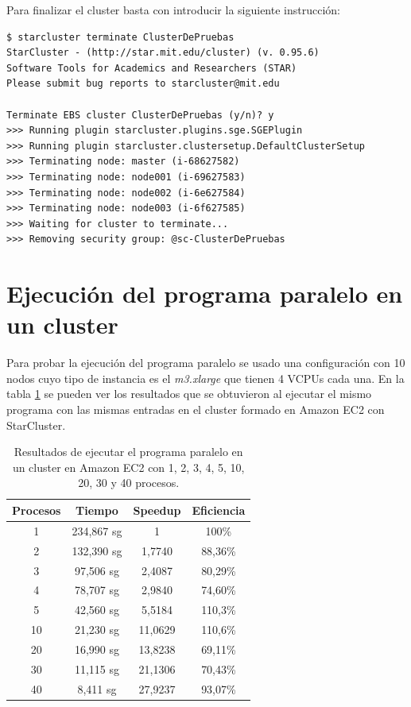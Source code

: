 \documentclass{article}
\begin{document}
	Para finalizar el cluster basta con introducir la siguiente instrucción:
\begin{lstlisting}[style=miniBash]
$ starcluster terminate ClusterDePruebas
StarCluster - (http://star.mit.edu/cluster) (v. 0.95.6)
Software Tools for Academics and Researchers (STAR)
Please submit bug reports to starcluster@mit.edu

Terminate EBS cluster ClusterDePruebas (y/n)? y
>>> Running plugin starcluster.plugins.sge.SGEPlugin
>>> Running plugin starcluster.clustersetup.DefaultClusterSetup
>>> Terminating node: master (i-68627582)
>>> Terminating node: node001 (i-69627583)
>>> Terminating node: node002 (i-6e627584)
>>> Terminating node: node003 (i-6f627585)
>>> Waiting for cluster to terminate... 
>>> Removing security group: @sc-ClusterDePruebas 
\end{lstlisting}

\section{Ejecución del programa paralelo en un cluster}
	Para probar la ejecución del programa paralelo se usado una configuración con 10 nodos cuyo tipo de instancia es el \emph{m3.xlarge} que tienen 4 VCPUs cada una. En la tabla \ref{tab:resultadosCluster} se pueden ver los resultados que se obtuvieron al ejecutar el mismo programa con las mismas entradas en el cluster formado en Amazon EC2 con StarCluster.

\begin{table}[h]
	\begin{center}
		\caption{Resultados de ejecutar el programa paralelo en un cluster en Amazon EC2 con 1, 2, 3, 4, 5, 10, 20, 30 y 40 procesos.}
		\begin{tabular}{|c|c|c|c|}
\hline
\textbf{Procesos} &
\textbf{Tiempo} &
\textbf{Speedup} &
\textbf{Eficiencia} \\ \hline
\hline
 1 &234,867 sg &  1          & 100\% \\ \hline
 2 &132,390 sg &  1,7740 & 88,36\% \\ \hline 
 3 & 97,506 sg &  2,4087 & 80,29\% \\ \hline
 4 & 78,707 sg &  2,9840 & 74,60\% \\ \hline
 5 & 42,560 sg &  5,5184 & 110,3\% \\ \hline
10 & 21,230 sg & 11,0629 & 110,6\% \\ \hline
20 & 16,990 sg &  13,8238& 69,11\% \\ \hline
30 & 11,115 sg & 21,1306 & 70,43\% \\ \hline
40 &  8,411 sg &  27,9237& 93,07\% \\ \hline
		\end{tabular}
		\label{tab:resultadosCluster}
	\end{center}
\end{table}
\end{document}
